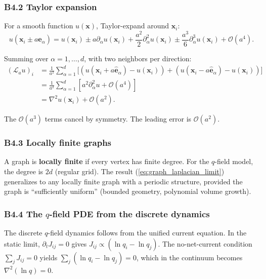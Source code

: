 \documentclass[reprint]{revtex4-2}
\begin{document}
\subsubsection{B4.2 Taylor expansion}

For a smooth function $u(\mathbf{x})$, Taylor-expand around $\mathbf{x}_i$:
\begin{equation}
u(\mathbf{x}_i \pm a\hat{\mathbf{e}}_\alpha) = u(\mathbf{x}_i) \pm a\partial_\alpha u(\mathbf{x}_i) + \frac{a^2}{2}\partial_\alpha^2 u(\mathbf{x}_i) \pm \frac{a^3}{6}\partial_\alpha^3 u(\mathbf{x}_i) + \mathcal{O}(a^4).
\end{equation}

Summing over $\alpha = 1,\ldots,d$, with two neighbors per direction:
\begin{align}
(\mathcal{L}_a u)_i &= \frac{1}{a^2}\sum_{\alpha=1}^d \Big[(u(\mathbf{x}_i + a\hat{\mathbf{e}}_\alpha) - u(\mathbf{x}_i)) + (u(\mathbf{x}_i - a\hat{\mathbf{e}}_\alpha) - u(\mathbf{x}_i))\Big]\\
&= \frac{1}{a^2}\sum_{\alpha=1}^d \left[a^2\partial_\alpha^2 u + \mathcal{O}(a^4)\right]\\
&= \nabla^2 u(\mathbf{x}_i) + \mathcal{O}(a^2).
\label{eq:graph_laplacian_limit}
\end{align}

The $\mathcal{O}(a^3)$ terms cancel by symmetry. The leading error is $\mathcal{O}(a^2)$.

\subsubsection{B4.3 Locally finite graphs}

A graph is \textbf{locally finite} if every vertex has finite degree. For the $q$-field model, the degree is $2d$ (regular grid). The result (\ref{eq:graph_laplacian_limit}) generalizes to any locally finite graph with a periodic structure, provided the graph is ``sufficiently uniform'' (bounded geometry, polynomial volume growth).

\subsubsection{B4.4 The $q$-field PDE from the discrete dynamics}

The discrete $q$-field dynamics follows from the unified current equation. In the static limit, $\partial_t J_{ij}=0$ gives $J_{ij} \propto (\ln q_i - \ln q_j)$. The no-net-current condition $\sum_j J_{ij}=0$ yields $\sum_j (\ln q_i - \ln q_j) = 0$, which in the continuum becomes $\nabla^2(\ln q)=0$.
\end{document}
